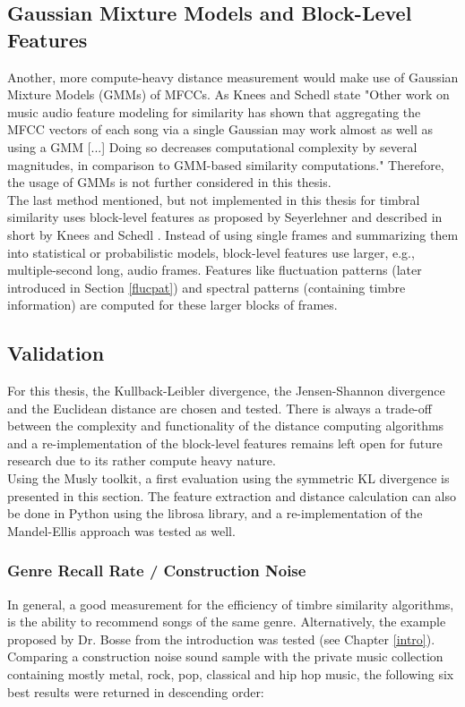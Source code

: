 \subsection{Gaussian Mixture Models and Block-Level Features}\label{blocklevel}
Another, more compute-heavy distance measurement would make use of Gaussian Mixture Models (GMMs) of MFCCs. As Knees and Schedl state "Other work on music audio feature modeling for similarity has shown that aggregating the MFCC vectors of each song via a single Gaussian may work almost as well as using a GMM [...] Doing so decreases computational complexity by several magnitudes, in comparison to GMM-based similarity computations." \cite[p. 65]{knees1} Therefore, the usage of GMMs is not further considered in this thesis.\\
The last method mentioned, but not implemented in this thesis for timbral similarity uses block-level features as proposed by Seyerlehner \cite{seyerlehnerblock} and described in short by Knees and Schedl \cite[p. 67]{knees1}. Instead of using single frames and summarizing them into statistical or probabilistic models, block-level features use larger, e.g., multiple-second long, audio frames. Features like fluctuation patterns (later introduced in Section \ref{flucpat}) and spectral patterns (containing timbre information) are computed for these larger blocks of frames. 

\subsection{Validation}

For this thesis, the Kullback-Leibler divergence, the Jensen-Shannon divergence and the Euclidean distance are chosen and tested. There is always a trade-off between the complexity and functionality of the distance computing algorithms and a re-implementation of the block-level features remains left open for future research due to its rather compute heavy nature.\\
Using the Musly toolkit, a first evaluation using the symmetric KL divergence is presented in this section. The feature extraction and distance calculation can also be done in Python using the librosa library, and a re-implementation of the Mandel-Ellis approach was tested as well.\\

\subsubsection{Genre Recall Rate / Construction Noise}
In general, a good measurement for the efficiency of timbre similarity algorithms, is the ability to recommend songs of the same genre. 
Alternatively, the example proposed by Dr. Bosse from the introduction was tested (see Chapter \ref{intro}). Comparing a construction noise sound sample with the private music collection containing mostly metal, rock, pop, classical and hip hop music, the following six best results were returned in descending order: 


